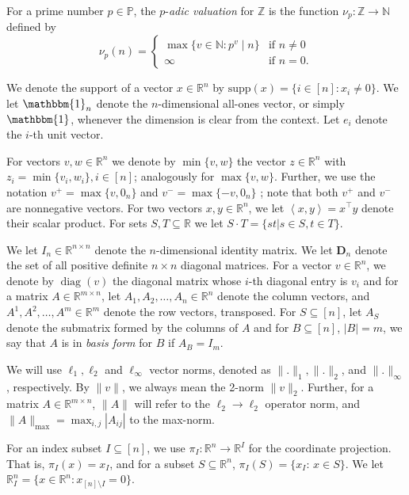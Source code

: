 \documentclass[11pt, a4paper]{article}
\newcommand{\Diag}{\operatorname{diag}}
\newcommand{\pr}[2]{\left\langle #1, #2 \right\rangle}
\newcommand{\supp}{\mathrm{supp}}
\newcommand{\1}{\mathbbm{1}}
\newcommand{\primes}{\mathbb{P}}
\newcommand{\divides}{\mid}
\newcommand{\bD}{\mathbf{D}}
\theoremstyle{case}
\newcommand{\R}{\mathbb{R}}
\newcommand{\Z}{\mathbb{Z}}
\newcommand{\N}{\mathbb{N}}
\begin{document}
For a prime number $p\in \primes$, the $p$-\emph{adic valuation} for $\mathbb{Z}$ is the function $\nu_p\colon \Z \to \N$ defined by
\begin{equation}\label{eq:p-adic}
  \nu_p(n) =
  \begin{cases}
      \max \{v \in \N : p^v \divides n\} & \text{if } n \neq 0\\
      \infty & \text{if } n=0.
  \end{cases}
\end{equation}

We denote the support of a vector $x \in \R^n$ by $\supp(x) = \{i\in [n]: x_i \neq 0\}$.  We let ${\1}_n$ denote the $n$-dimensional all-ones vector, or simply $\1$, whenever the dimension is clear from the context. Let $e_i$ denote the $i$-th unit vector.

For vectors $v, w \in \R^n$ we denote by $\min\{v,w\}$ the vector $z \in \R^n$ with $z_i = \min\{v_i, w_i\}, i \in [n]$; analogously for $\max\{v,w\}$. Further, we use the notation $v^+ = \max\{v, 0_n\}$ and $v^- = \max\{-v, 0_n\}$ 
; note that both $v^+$ and $v^-$ are nonnegative vectors. 
For two vectors $x, y \in \R^n$, we let $\pr{x}{y}=x^\top y$ denote their scalar product. For sets $S, T \subseteq \R$ we let $S \cdot T = \{st | s \in S, t \in T\}$.

We let $I_n\in \R^{n\times n}$ denote the $n$-dimensional identity matrix.  We let $\bD_n$ denote the set of all positive definite $n\times n$
diagonal matrices. 
For a vector $v \in \R^n$, we denote by $\Diag(v)$ the diagonal matrix whose $i$-th diagonal entry is $v_i$ and for a matrix $A\in\R^{m\times n}$, let $A_1,A_2,\ldots,A_n\in \R^n$ denote the column vectors, and $A^1,A^2,\ldots,A^m\in\R^m$ denote the row vectors, transposed. For $S\subseteq [n]$, let $A_S$ denote the submatrix formed by the columns of $A$ and for $B\subseteq [n]$, $|B|=m$, we say that $A$ is in \emph{basis form} for $B$ if $A_B=I_m$.

We will use $\ell_1,\ell_2$ and $\ell_\infty$ vector norms, denoted as $\|.\|_1,\|.\|_2$, and $\|.\|_\infty$, respectively. By $\|v\|$, we always mean the 2-norm $\|v\|_2$. Further, for a matrix $A\in\R^{m\times n}$, $\|A\|$ will refer to the $\ell_2\to\ell_2$ operator norm, 
and $\|A\|_{\max}=\max_{i,j}|A_{ij}|$ to the max-norm.

For an index subset $I\subseteq [n]$, we use $\pi_I: \R^n \rightarrow \R^I$ for the coordinate
projection. That is, $\pi_I(x)=x_I$, and for a subset $S\subseteq
\R^n$, $\pi_I(S)=\{x_I:\, x\in S\}$.
We let $\R^n_I = \{x \in \R^n : x_{[n]\setminus I} = 0\}$.
\end{document}
